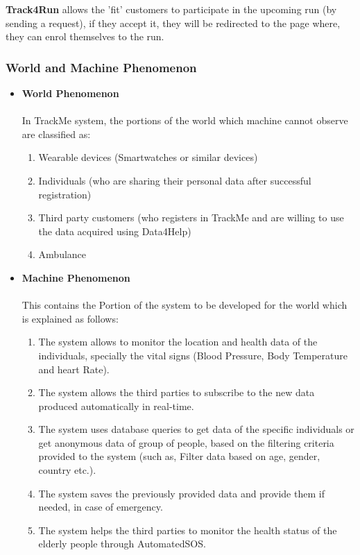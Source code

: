 \documentclass[12pt]{article}
\begin{document}
\textbf{Track4Run} allows the 'fit' customers to participate in the upcoming run (by sending a request), if they accept it, they will be redirected to the page where, they can enrol themselves to the run.\\

\subsubsection{World and Machine Phenomenon}
\begin{itemize}
\item \textbf{World Phenomenon}
\\
\\
In TrackMe system, the portions of the world which machine cannot observe are classified as:
\begin{enumerate}
\item{} Wearable devices (Smartwatches or similar devices)
\item{} Individuals (who are sharing their personal data after successful registration)
\item{} Third party customers (who registers in TrackMe and are willing to use the data acquired using Data4Help)
\item{} Ambulance 
\end{enumerate}
\item \textbf{Machine Phenomenon}
\\
\\
This contains the Portion of the system to be developed for the world which is explained as follows:
\begin{enumerate}
\item{} The system allows to monitor the location and health data of the individuals, specially the vital signs (Blood Pressure, Body Temperature and heart Rate).
\item{} The system allows the third parties to subscribe to the new data produced automatically in real-time.
\item{} The system uses database queries to get data of the specific individuals or get anonymous data of group of people, based on the filtering criteria provided to the system (such as, Filter data based on age, gender, country etc.).
\item{} The system saves the previously provided data and provide them if needed, in case of emergency. 
\item{} The system helps the third parties to monitor the health status of the elderly people through AutomatedSOS.

\end{enumerate}
\end{itemize}
\end{document}
